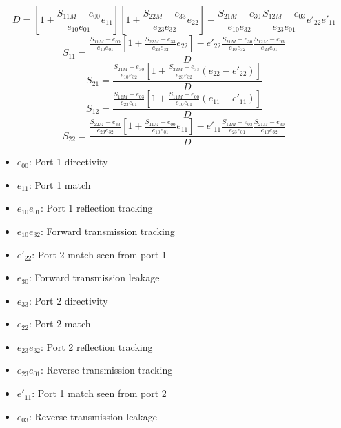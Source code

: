 \begin{equation}
D = \left[1+\frac{S_{11M}-e_{00}}{e_{10}e_{01}}e_{11}\right]
\left[1+\frac{S_{22M}-e_{33}}{e_{23}e_{32}}e_{22}\right]-
\frac{S_{21M}-e_{30}}{e_{10}e_{32}}
\frac{S_{12M}-e_{03}}{e_{23}e_{01}}
e'_{22}e'_{11}
\end{equation}
\begin{equation}
S_{11}= \frac{\frac{S_{11M}-e_{00}}{e_{10}e_{01}}\left[ 1+\frac{S_{22M}-e_{33}}{e_{23}e_{32}}e_{22}\right]-e'_{22}\frac{S_{21M}-e_{30}}{e_{10}e_{32}}\frac{S_{12M}-e_{03}}{e_{23}e_{01}}}{D}
\end{equation}
\begin{equation}
S_{21} = \frac{\frac{S_{21M}-e_{30}}{e_{10}e_{32}}\left[1+\frac{S_{22M}-e_{33}}{e_{23}e_{32}}(e_{22}-e'_{22})\right]}{D}
\end{equation}
\begin{equation}
S_{12} = \frac{\frac{S_{12M}-e_{03}}{e_{23}e_{01}}\left[1+\frac{S_{11M}-e_{00}}{e_{10}e_{01}}(e_{11}-e'_{11})\right]}{D}
\end{equation}
\begin{equation}
S_{22}= \frac{\frac{S_{22M}-e_{33}}{e_{23}e_{32}}\left[ 1+\frac{S_{11M}-e_{00}}{e_{10}e_{01}}e_{11}\right]-e'_{11}\frac{S_{12M}-e_{03}}{e_{23}e_{01}}\frac{S_{21M}-e_{30}}{e_{10}e_{32}}}{D}
\end{equation}
\newpage
\begin{itemize}
	\item $e_{00}$: Port 1 directivity
	\item $e_{11}$: Port 1 match
	\item $e_{10}e_{01}$: Port 1 reflection tracking
	\item $e_{10}e_{32}$: Forward transmission tracking
	\item $e'_{22}$: Port 2 match seen from port 1
	\item $e_{30}$: Forward transmission leakage
	\item $e_{33}$: Port 2 directivity
	\item $e_{22}$: Port 2 match
	\item $e_{23}e_{32}$: Port 2 reflection tracking
	\item $e_{23}e_{01}$: Reverse transmission tracking
	\item $e'_{11}$: Port 1 match seen from port 2
	\item $e_{03}$: Reverse transmission leakage
\end{itemize}



